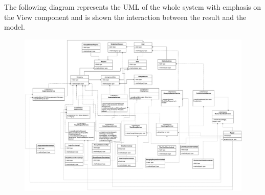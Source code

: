 \documentclass{article}
\begin{document}
\newpage
The following diagram represents the UML of the whole system with emphasis on the View component and is shown the interaction between the result and the model.
\begin{figure}[h!]
\centering
    \textbf{}\par\medskip
	\includegraphics[width= \linewidth]{UMLbig.png}
\end{figure}
\newpage
\end{document}

